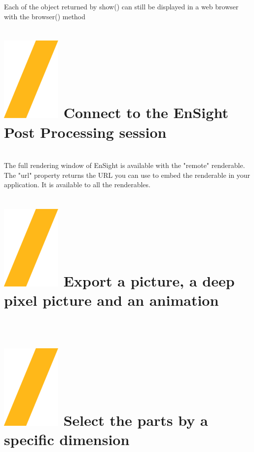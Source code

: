 \documentclass[9pt,landscape]{article}
\begin{document}
\begin{multicols}{3}
Each of the object returned by show() can still be displayed in a web browser with the browser() method

\section{{\includegraphics[height=\fontcharht\font`\S]{slash.png}  Connect to the EnSight Post Processing session}} \\

The full rendering window of EnSight is available with the "remote" renderable.
The "url" property returns the URL you can use to embed the renderable in your application. It is available to all the renderables.

\section{{\includegraphics[height=\fontcharht\font`\S]{slash.png}  Export a picture, a deep pixel picture and an animation}} \\


\section{{\includegraphics[height=\fontcharht\font`\S]{slash.png}  Select the parts by a specific dimension}} \\



\end{multicols}
\end{document}
